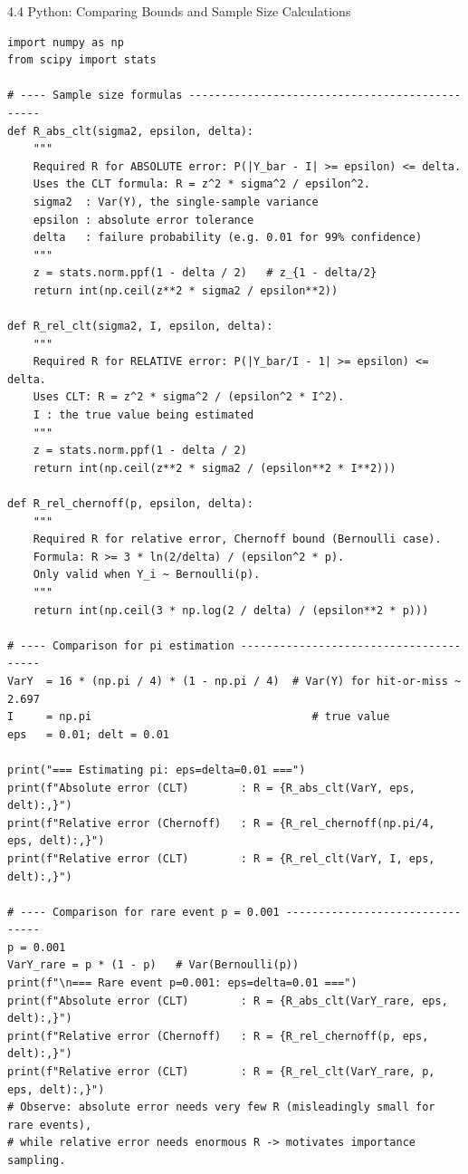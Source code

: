 \documentclass[aspectratio=169,10pt]{beamer}
\begin{document}
\begin{frame}[fragile]{4.4 Python: Comparing Bounds and Sample Size Calculations}
\begin{lstlisting}[style=python]
import numpy as np
from scipy import stats

# ---- Sample size formulas -----------------------------------------------
def R_abs_clt(sigma2, epsilon, delta):
    """
    Required R for ABSOLUTE error: P(|Y_bar - I| >= epsilon) <= delta.
    Uses the CLT formula: R = z^2 * sigma^2 / epsilon^2.
    sigma2  : Var(Y), the single-sample variance
    epsilon : absolute error tolerance
    delta   : failure probability (e.g. 0.01 for 99% confidence)
    """
    z = stats.norm.ppf(1 - delta / 2)   # z_{1 - delta/2}
    return int(np.ceil(z**2 * sigma2 / epsilon**2))

def R_rel_clt(sigma2, I, epsilon, delta):
    """
    Required R for RELATIVE error: P(|Y_bar/I - 1| >= epsilon) <= delta.
    Uses CLT: R = z^2 * sigma^2 / (epsilon^2 * I^2).
    I : the true value being estimated
    """
    z = stats.norm.ppf(1 - delta / 2)
    return int(np.ceil(z**2 * sigma2 / (epsilon**2 * I**2)))

def R_rel_chernoff(p, epsilon, delta):
    """
    Required R for relative error, Chernoff bound (Bernoulli case).
    Formula: R >= 3 * ln(2/delta) / (epsilon^2 * p).
    Only valid when Y_i ~ Bernoulli(p).
    """
    return int(np.ceil(3 * np.log(2 / delta) / (epsilon**2 * p)))

# ---- Comparison for pi estimation ---------------------------------------
VarY  = 16 * (np.pi / 4) * (1 - np.pi / 4)  # Var(Y) for hit-or-miss ~ 2.697
I     = np.pi                                  # true value
eps   = 0.01; delt = 0.01

print("=== Estimating pi: eps=delta=0.01 ===")
print(f"Absolute error (CLT)        : R = {R_abs_clt(VarY, eps, delt):,}")
print(f"Relative error (Chernoff)   : R = {R_rel_chernoff(np.pi/4, eps, delt):,}")
print(f"Relative error (CLT)        : R = {R_rel_clt(VarY, I, eps, delt):,}")

# ---- Comparison for rare event p = 0.001 --------------------------------
p = 0.001
VarY_rare = p * (1 - p)   # Var(Bernoulli(p))
print(f"\n=== Rare event p=0.001: eps=delta=0.01 ===")
print(f"Absolute error (CLT)        : R = {R_abs_clt(VarY_rare, eps, delt):,}")
print(f"Relative error (Chernoff)   : R = {R_rel_chernoff(p, eps, delt):,}")
print(f"Relative error (CLT)        : R = {R_rel_clt(VarY_rare, p, eps, delt):,}")
# Observe: absolute error needs very few R (misleadingly small for rare events),
# while relative error needs enormous R -> motivates importance sampling.
\end{lstlisting}
\end{frame}
\end{document}
